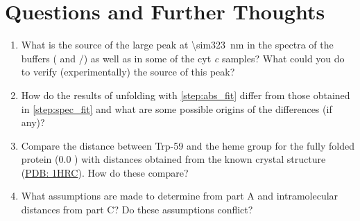 
\section{Questions and Further Thoughts} %
\label{sec:questions_and_further_thoughts}

\begin{enumerate}
	\item What is the source of the large peak at \SI{\sim323}{\nm} in the spectra of the buffers ( and /) as well as in some of the cyt \emph{c} samples?
	What could you do to verify (experimentally) the source of this peak?
	\item How do the results of unfolding with \cref{step:abs_fit} differ from those obtained in \cref{step:spec_fit} and what are some possible origins of the differences (if any)?
	\item Compare the distance between Trp-59 and the heme group for the fully folded protein (\SI{0.0}{\Molar} ) with distances obtained from the known crystal structure (\href{https://www.rcsb.org/structure/1hrc}{PDB: 1HRC}). 
	How do these compare?
	\item What assumptions are made to determine \gibbs*[subscript-right=\ch{H2O}]{} from part A and intramolecular distances from part C? 
	Do these assumptions conflict?

\end{enumerate}

